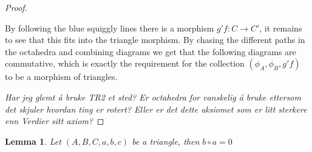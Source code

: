 \documentclass[11pt]{article}
\newtheorem{lemma}[theorem]{Lemma}
\theoremstyle{definition}
\theoremstyle{remark}
\begin{document}
\begin{proof}
\begin{minipage}[t]{0.48\textwidth}
\begin{center}
                        \end{center}
                    \end{minipage}
                    By following the blue squiggly lines there is a morphism $g'f:C\rightarrow C'$, it remains to see that this fits into the triangle morphism. By chasing the different paths in the octahedra and combining diagrams we get that the following diagrams are commutative, which is exactly the requirement for the collection $(\phi_A,\phi_B,g'f)$ to be a morphism of triangles.
                    \begin{center}
                    \end{center}

                    \emph{Har jeg glemt å bruke TR2 et sted? Er octahedra for vanskelig å bruke ettersom det skjuler hvordan ting er rotert? Eller er det dette aksiomet som er litt sterkere enn Verdier sitt axiom?}

            \end{proof}

            \begin{lemma}
                Let $(A,B,C,a,b,c)$ be a triangle, then $b\circ a=0$
            \end{lemma}
\end{document}
